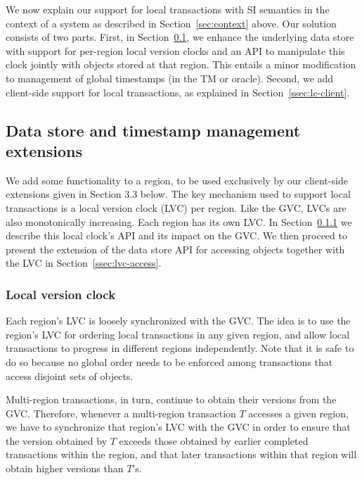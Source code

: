 

We now explain our support for local transactions with SI semantics in the
context of a system as described in Section~\ref{sec:context} above. Our
solution consists of two parts. First, in Section~\ref{ssec:region-clock}, we enhance the
underlying data store with support for per-region local version clocks and an
API to manipulate this clock jointly with objects stored at that region. This
entails a minor modification to management of global timestamps (in the TM or oracle). 
Second, we add client-side support for local transactions, as explained in Section~\ref{ssec:lc-client}.

\subsection{Data store and timestamp management extensions} \label{ssec:region-clock}

We add some functionality to a region, to be used exclusively by our client-side
extensions given in Section 3.3 below. The key mechanism used to support local
transactions is a local version clock (LVC) per region. Like the GVC, LVCs are
also monotonically increasing. Each region has its
own LVC. In Section~\ref{ssec:lvc} we describe this local clock's API and its impact on
the GVC. We then proceed to present the extension of the data store API for
accessing objects together with the LVC in Section~\ref{ssec:lvc-access}.

\subsubsection{Local version clock} \label{ssec:lvc}


Each region's LVC is loosely synchronized with the GVC. The idea is to use the
region's LVC for ordering local transactions in any given region, and allow
local transactions to progress in different regions independently. Note that it
is safe to do so because no global order needs to be enforced among transactions
that access disjoint sets of objects.

Multi-region transactions, in turn, continue to obtain their versions from the
GVC. Therefore, whenever a multi-region transaction $T$ accesses a given region,
we have to synchronize that region's LVC with the GVC in order to ensure that
the version obtained by $T$ exceeds those obtained by earlier completed
transactions within the region, and that later transactions within that region
will obtain higher versions than $T$'s.

